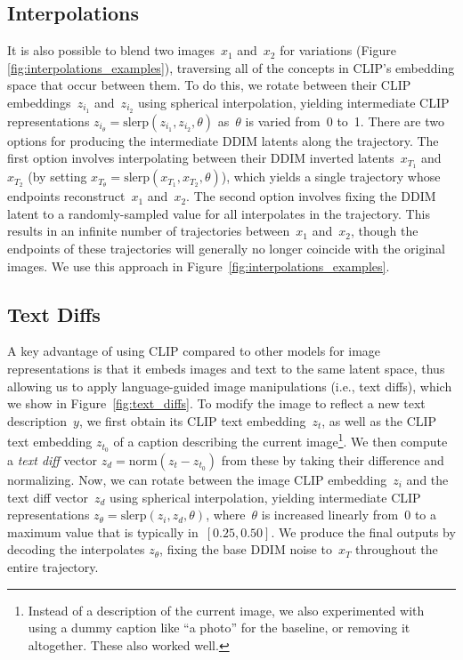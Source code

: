 \subsection{Interpolations}
\label{sec:interpolations}
It is also possible to blend two images~$x_1$ and~$x_2$ for variations (Figure \ref{fig:interpolations_examples}), traversing all of the concepts in CLIP's embedding space that occur between them. To do this, we rotate between their CLIP embeddings~$z_{i_1}$ and~$z_{i_2}$ using spherical interpolation, yielding intermediate CLIP representations $z_{i_\theta} = \text{slerp}(z_{i_1}, z_{i_2}, \theta)$ as~$\theta$ is varied from~0 to~1. There are two options for producing the intermediate DDIM latents along the trajectory. The first option involves interpolating between their DDIM inverted latents~$x_{T_1}$ and~$x_{T_2}$ (by setting $x_{T_\theta} = \text{slerp}(x_{T_1}, x_{T_2}, \theta)$), which yields a single trajectory whose endpoints reconstruct~$x_1$ and~$x_2$. The second option involves fixing the DDIM latent to a randomly-sampled value for all interpolates in the trajectory. This results in an infinite number of trajectories between~$x_1$ and~$x_2$, though the endpoints of these trajectories will generally no longer coincide with the original images. We use this approach in Figure~\ref{fig:interpolations_examples}.

\subsection{Text Diffs}
\label{sec:text_diffs}
A key advantage of using CLIP compared to other models for image representations is that it embeds images and text to the same latent space, thus allowing us to apply language-guided image manipulations (i.e., text diffs), which we show in Figure~\ref{fig:text_diffs}. To modify the image to reflect a new text description~$y$, we first obtain its CLIP text embedding~$z_t$, as well as the CLIP text embedding $z_{t_0}$ of a caption describing the current image\footnote{Instead of a description of the current image, we also experimented with using a dummy caption like ``a photo'' for the baseline, or removing it altogether. These also worked well.}. We then compute a \textit{text diff} vector $z_d = \text{norm}(z_t - z_{t_0})$ from these by taking their difference and normalizing. Now, we can rotate between the image CLIP embedding~$z_i$ and the text diff vector~$z_d$ using spherical interpolation, yielding intermediate CLIP representations $z_\theta = \text{slerp}(z_i, z_d, \theta)$, where~$\theta$ is increased linearly from~0 to a maximum value that is typically in~$[0.25, 0.50]$. We produce the final outputs by decoding the interpolates $z_\theta$, fixing the base DDIM noise to~$x_T$ throughout the entire trajectory.


